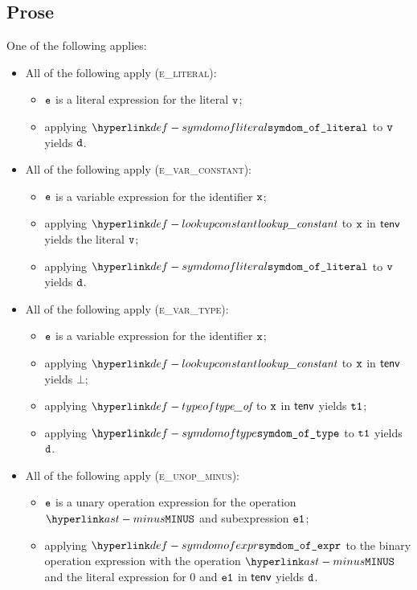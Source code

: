 \subsection{Prose}
One of the following applies:
\begin{itemize}
  \item All of the following apply (\textsc{e\_literal}):
  \begin{itemize}
    \item $\texttt{e}$ is a literal expression for the literal $\texttt{v}$;
    \item applying $\symdomofliteral$ to $\texttt{v}$ yields $\texttt{d}$.
  \end{itemize}

  \item All of the following apply (\textsc{e\_var\_constant}):
  \begin{itemize}
    \item $\texttt{e}$ is a variable expression for the identifier $\texttt{x}$;
    \item applying $\lookupconstant$ to $\texttt{x}$ in $\textsf{tenv}$ yields the literal $\texttt{v}$;
    \item applying $\symdomofliteral$ to $\texttt{v}$ yields $\texttt{d}$.
  \end{itemize}

  \item All of the following apply (\textsc{e\_var\_type}):
  \begin{itemize}
    \item $\texttt{e}$ is a variable expression for the identifier $\texttt{x}$;
    \item applying $\lookupconstant$ to $\texttt{x}$ in $\textsf{tenv}$ yields $\bot$;
    \item applying $\typeof$ to $\texttt{x}$ in $\textsf{tenv}$ yields $\texttt{t1}$;
    \item applying $\symdomoftype$ to $\texttt{t1}$ yields $\texttt{d}$.
  \end{itemize}

  \item All of the following apply (\textsc{e\_unop\_minus}):
  \begin{itemize}
    \item $\texttt{e}$ is a unary operation expression for the operation $\MINUS$ and subexpression $\texttt{e1}$;
    \item applying $\symdomofexpr$ to the binary operation expression with the operation $\MINUS$
          and the literal expression for $0$ and $\texttt{e1}$ in $\textsf{tenv}$ yields $\texttt{d}$.
  \end{itemize}


\end{itemize}

